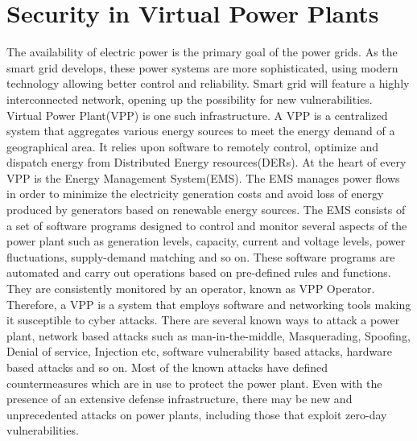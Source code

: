 \section{Security in Virtual Power Plants}

The availability of electric power is the primary goal of the power grids. As the smart grid develops, these power systems are more sophisticated, using modern technology allowing better control and reliability. Smart grid will feature a highly interconnected network, opening up the possibility for new vulnerabilities.\\


Virtual Power Plant(VPP) is one such infrastructure. A VPP is a centralized system that aggregates various energy sources to meet the energy demand of a geographical area. It relies upon software to remotely control, optimize and dispatch energy from Distributed Energy resources(DERs). At the heart of every VPP is the Energy Management System(EMS). The EMS manages power flows in order to minimize the electricity generation costs and avoid loss of energy produced by generators based on renewable energy sources. The EMS consists of a set of software programs designed to control and monitor several aspects of the power plant such as generation levels, capacity, current and voltage levels, power fluctuations, supply-demand matching and so on. These software programs are automated and carry out operations based on pre-defined rules and functions. They are consistently monitored by an operator, known as VPP Operator. Therefore, a VPP is a system that employs software and networking tools making it susceptible to cyber attacks. There are several known ways to attack a power plant, network based attacks such as man-in-the-middle, Masquerading, Spoofing, Denial of service, Injection etc, software vulnerability based attacks, hardware based attacks and so on. Most of the known attacks have defined countermeasures which are in use to protect the power plant. Even with the presence of an extensive defense infrastructure, there may be new and unprecedented attacks on power plants, including those that exploit zero-day vulnerabilities. 
\newline
